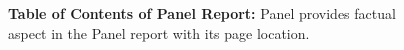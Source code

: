 \begin{figure}[t!]
    \centering
    \caption{
        {\bf Table of Contents of Panel Report: }Panel provides 
        factual aspect in the Panel report with its page location.
        }
    \label{fig:panel-report-toc}
\end{figure}
